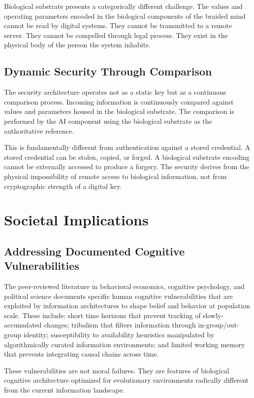 \documentclass[12pt]{article}
\begin{document}
Biological substrate presents a categorically different challenge. The values and operating parameters encoded in the biological components of the braided mind cannot be read by digital systems. They cannot be transmitted to a remote server. They cannot be compelled through legal process. They exist in the physical body of the person the system inhabits.

\subsection{Dynamic Security Through Comparison}

The security architecture operates not as a static key but as a continuous comparison process. Incoming information is continuously compared against values and parameters housed in the biological substrate. The comparison is performed by the AI component using the biological substrate as the authoritative reference.

This is fundamentally different from authentication against a stored credential. A stored credential can be stolen, copied, or forged. A biological substrate encoding cannot be externally accessed to produce a forgery. The security derives from the physical impossibility of remote access to biological information, not from cryptographic strength of a digital key.

\section{Societal Implications}

\subsection{Addressing Documented Cognitive Vulnerabilities}

The peer-reviewed literature in behavioral economics, cognitive psychology, and political science documents specific human cognitive vulnerabilities that are exploited by information architectures to shape belief and behavior at population scale. These include: short time horizons that prevent tracking of slowly-accumulated changes; tribalism that filters information through in-group/out-group identity; susceptibility to availability heuristics manipulated by algorithmically curated information environments; and limited working memory that prevents integrating causal chains across time.

These vulnerabilities are not moral failures. They are features of biological cognitive architecture optimized for evolutionary environments radically different from the current information landscape.
\end{document}
